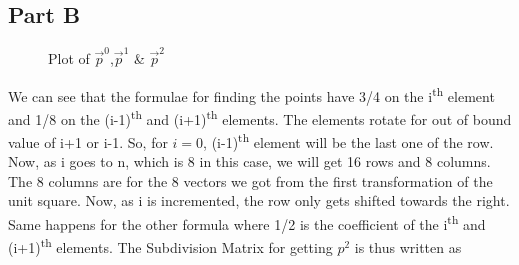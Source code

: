 \documentclass[12pt,a4paper]{article}
\begin{document}
\subsection{Part B}
\begin{wrapfigure}[8]{r}{6cm}
\centering
\vspace{-1cm}
\caption{Plot of $\Vec{p}^0$,$\Vec{p}^1$ \& $\Vec{p}^2$}
\end{wrapfigure}

We can see that the formulae for finding the points have 3/4 on the i\textsuperscript{th} element and 1/8 on the (i-1)\textsuperscript{th} and (i+1)\textsuperscript{th} elements. The elements rotate for out of bound value of i+1 or i-1. So, for $i=0$, (i-1)\textsuperscript{th} element will be the last one of the row. Now, as i goes to n, which is 8 in this case, we will get 16 rows and 8 columns. The 8 columns are for the 8 vectors we got from the first transformation of the unit square. Now, as i is incremented, the row only gets shifted towards the right. Same happens for the other formula where 1/2 is the coefficient of the i\textsuperscript{th} and (i+1)\textsuperscript{th} elements.
The Subdivision Matrix for getting $p^2$ is thus written as
\end{document}
